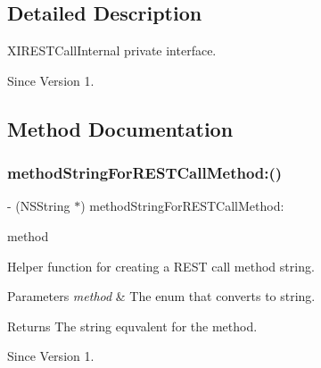 \subsection{Detailed Description}
X\+I\+R\+E\+S\+T\+Call\+Internal private interface. 

\begin{DoxySince}{Since}
Version 1. 
\end{DoxySince}


\subsection{Method Documentation}
\hypertarget{category_x_i_simple_r_e_s_t_call_07_08_ad1cad88893cef3f2437547a390239c09}{}\label{category_x_i_simple_r_e_s_t_call_07_08_ad1cad88893cef3f2437547a390239c09} 
\subsubsection{\texorpdfstring{method\+String\+For\+R\+E\+S\+T\+Call\+Method\+:()}{methodStringForRESTCallMethod:()}}
{\footnotesize\ttfamily -\/ (N\+S\+String $\ast$) method\+String\+For\+R\+E\+S\+T\+Call\+Method\+: \begin{DoxyParamCaption}\item[{(X\+I\+R\+E\+S\+T\+Call\+Method)}]{method }\end{DoxyParamCaption}}



Helper function for creating a R\+E\+ST call method string. 


\begin{DoxyParams}{Parameters}
{\em method} & The enum that converts to string. \\
\hline
\end{DoxyParams}
\begin{DoxyReturn}{Returns}
The string equvalent for the method. 
\end{DoxyReturn}
\begin{DoxySince}{Since}
Version 1. 
\end{DoxySince}
\hypertarget{category_x_i_simple_r_e_s_t_call_07_08_a263c210c47255d82bb27c47b5babd20e}{}\label{category_x_i_simple_r_e_s_t_call_07_08_a263c210c47255d82bb27c47b5babd20e} 
